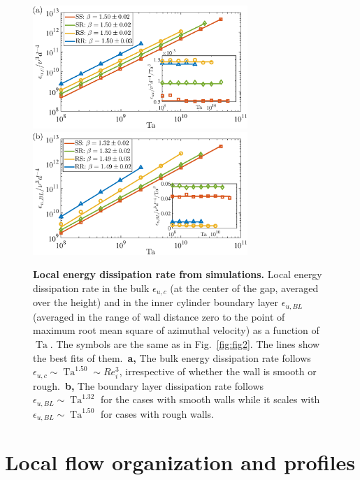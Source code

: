 \documentclass[aps,prl,superscriptaddress,preprint]{revtex4}
\newcommand{\Ta}{\operatorname{Ta}}
\begin{document}
\begin{figure}[htbp]
     \includegraphics[width=3.2in]{5a.eps}
    \includegraphics[width=3.2in]{5b.eps}
\caption{{\bf Local energy dissipation rate from simulations.} Local energy dissipation rate in the bulk $\epsilon_{u,c}$ (at the center of the gap, averaged over the height) and in the inner cylinder boundary layer $\epsilon_{u,BL}$ (averaged in the range of wall distance zero to the point of maximum root mean square of azimuthal velocity) as a function of $\Ta$. The symbols are  the same as in Fig.\ \ref{fig:fig2}. The lines show the best fits of them.\ {\bf a,} The bulk energy dissipation rate follows $\epsilon_{u,c} \sim \Ta^{1.50} \sim Re_i^3$, irrespective of whether the wall is smooth or rough.\ {\bf b,} The boundary layer dissipation rate follows $\epsilon_{u,BL} \sim \Ta^{1.32}$ for the cases with smooth walls while it scales with $\epsilon_{u,BL} \sim \Ta^{1.50}$ for cases with rough walls.}
\label{fig4}
\end{figure}


\section{Local flow organization and profiles} 
\end{document}
